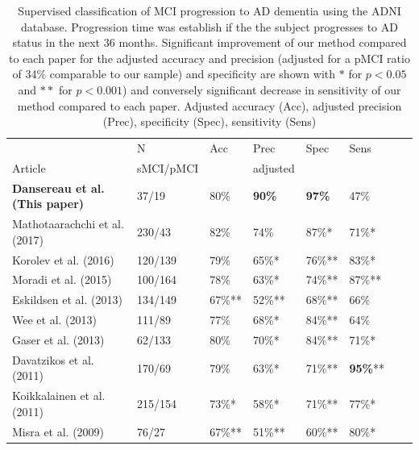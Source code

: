 \documentclass[authoryear]{elsarticle}
\begin{document}
\begin{table}[]
\centering
\caption{Supervised classification of MCI progression to AD dementia using the ADNI database. Progression time was establish if the the subject progresses to AD status in the next 36 months. Significant improvement of our method compared to each paper for the adjusted accuracy and precision (adjusted for a pMCI ratio of 34\% comparable to our sample) and specificity are shown with $*$ for $p<0.05$ and $**$ for $p<0.001$) and conversely significant decrease in sensitivity of our method compared to each paper. Adjusted accuracy (Acc), adjusted precision (Prec), specificity (Spec), sensitivity (Sens)}
\label{table_lit}
\begin{tabular}{llllllll}
                                       & N            & Acc      & Prec  & Spec   & Sens   \\
Article                                & sMCI/pMCI    &          & adjusted   &    &    \\ \hline
\textbf{Dansereau et al. (This paper)} & 37/19        & 80\%     & \textbf{90\%} & \textbf{97\%} & 47\%   \\
Mathotaarachchi et al. (2017)          & 230/43       & 82\%     & 74\%              & 87\%*           & 71\%*         \\
Korolev et al. (2016)                  & 120/139      & 79\%     & 65\%*            & 76\%**          & 83\%*       \\
Moradi et al. (2015)                   & 100/164      & 78\%     & 63\%*            & 74\%**          & 87\%**          \\ 
Eskildsen et al. (2013)                & 134/149      & 67\%**   & 52\%**           & 68\%**         & 66\%          \\ 
Wee et al. (2013)                      & 111/89       & 77\%     & 68\%*            & 84\%**         & 64\%          \\ 
Gaser et al. (2013)                    & 62/133       & 80\%     & 70\%*           & 84\%**         & 71\%*          \\ 
Davatzikos et al. (2011)               & 170/69       & 79\%     & 63\%*           & 71\%**        & \textbf{95\%}** \\ 
Koikkalainen et al. (2011)             & 215/154      & 73\%*    & 58\%*           & 71\%**        & 77\%*          \\ 
Misra et al. (2009)                    & 76/27        & 67\%**   & 51\%**         & 60\%**          & 80\%*          \\ 
\end{tabular}
\end{table}
\end{document}
